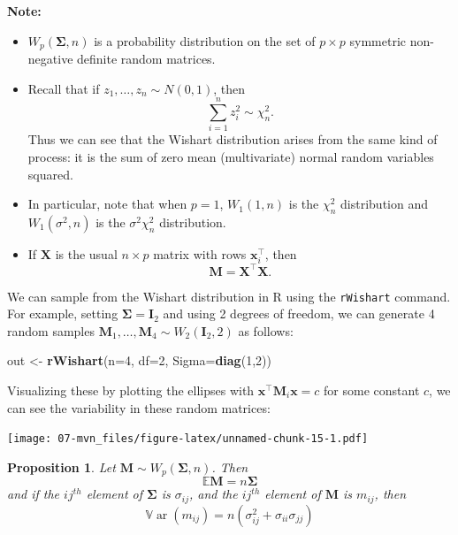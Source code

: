 \documentclass[]{book}
\newenvironment{Shaded}{\begin{snugshade}}{\end{snugshade}}
\newcommand{\DataTypeTok}[1]{\textcolor[rgb]{0.13,0.29,0.53}{#1}}
\newcommand{\DecValTok}[1]{\textcolor[rgb]{0.00,0.00,0.81}{#1}}
\newcommand{\KeywordTok}[1]{\textcolor[rgb]{0.13,0.29,0.53}{\textbf{#1}}}
\newcommand{\NormalTok}[1]{#1}
\newcommand{\StringTok}[1]{\textcolor[rgb]{0.31,0.60,0.02}{#1}}
\newtheorem{proposition}{Proposition}[chapter]
\theoremstyle{definition}
\theoremstyle{definition}
\theoremstyle{definition}
\theoremstyle{remark}
\begin{document}
\textbf{Note:}

\begin{itemize}
\item
  \(W_p(\boldsymbol{\Sigma},n)\) is a probability distribution on the set of \(p \times p\) symmetric non-negative definite random matrices.
\item
  Recall that if \(z_1, \ldots, z_n \sim N(0, 1)\), then
  \[\sum_{i=1}^n z_i^2 \sim \chi^2_n.\]
  Thus we can see that the Wishart distribution arises from the same kind of process: it is the sum of zero mean (multivariate) normal random variables squared.
\item
  In particular, note that
  when \(p=1\), \(W_1(1,n)\) is the \(\chi_n^2\) distribution and \(W_1(\sigma^2,n)\) is the \(\sigma^2 \chi_n^2\) distribution. 
\item
  If \(\mathbf X\) is the usual \(n \times p\) matrix with rows \(\mathbf x_i^\top\), then
  \[\mathbf M= \mathbf X^\top \mathbf X.\]
\end{itemize}

We can sample from the Wishart distribution in R using the \texttt{rWishart} command. For example, setting \(\boldsymbol{\Sigma}=\mathbf I_2\) and using 2 degrees of freedom, we can generate 4 random samples \(\mathbf M_1, \ldots, \mathbf M_4 \sim W_2(\mathbf I_2, 2)\) as follows:

\begin{Shaded}
\begin{Highlighting}[]
\NormalTok{out <-}\StringTok{ }\KeywordTok{rWishart}\NormalTok{(}\DataTypeTok{n=}\DecValTok{4}\NormalTok{, }\DataTypeTok{df=}\DecValTok{2}\NormalTok{, }\DataTypeTok{Sigma=}\KeywordTok{diag}\NormalTok{(}\DecValTok{1}\NormalTok{,}\DecValTok{2}\NormalTok{))}
\end{Highlighting}
\end{Shaded}

Visualizing these by plotting the ellipses with \(\mathbf x^\top \mathbf M_i \mathbf x=c\) for some constant \(c\), we can see the variability in these random matrices:

\texttt{[image: 07-mvn\_files/figure-latex/unnamed-chunk-15-1.pdf]}

\begin{proposition}
\protect\hypertarget{prp:wishartmean}{}{\label{prp:wishartmean} }Let \(\mathbf M\sim W_p(\boldsymbol{\Sigma}, n)\). Then
\[{\mathbb{E}}\mathbf M= n \boldsymbol{\Sigma}\]
and if the \(ij^{th}\) element of \(\boldsymbol{\Sigma}\) is \(\sigma_{ij}\), and the \(ij^{th}\) element of \(\mathbf M\) is \(m_{ij}\), then
\[{\mathbb{V}\operatorname{ar}}(m_{ij}) =  n \left(\sigma_{ij}^2+\sigma_{ii}\sigma_{jj} \right)\]
\end{proposition}
\end{document}
